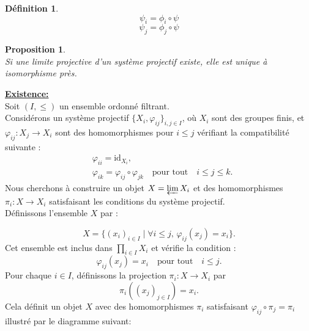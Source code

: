 \documentclass[a4paper, 14pt]{report}
\newtheorem{definition}{Définition}[section]
\newtheorem{proposition}{Proposition}[section]
\begin{document}
\begin{onehalfspace}
{\begin{definition}
				
				\[ \psi_{i} = \phi_{i} \circ \psi \]
				\[ \psi_{j} = \phi_{j} \circ \psi \]
				
			\end{definition}
			
			\begin{proposition}  \cite{maclane1971categories}\\
				Si une limite projective d'un système projectif existe, elle est unique à isomorphisme près.
			\end{proposition}
			
			\textbf{\underline{Existence:}}\\
			Soit \((I, \leq)\) un ensemble ordonné filtrant.\\
			Considérons un système projectif \(\{X_i, \varphi_{ij}\}_{i, j \in I}\), où \(X_i\) sont des groupes finis, et \(\varphi_{ij} : X_j \to X_i\) sont des homomorphismes pour \(i \leq j\) vérifiant la compatibilité suivante :
			\[
			\begin{aligned}
				&\varphi_{ii} = \text{id}_{X_i}, \\
				&\varphi_{ik} = \varphi_{ij} \circ \varphi_{jk} \quad \text{pour tout} \quad i \leq j \leq k.
			\end{aligned}
			\]
			Nous cherchons à construire un objet \(X = \varprojlim X_i\) et des homomorphismes \(\pi_i : X \to X_i\) satisfaisant les conditions du système projectif.\\
			Définissons l'ensemble \(X\) par :
			
			\[
			X = \{(x_i)_{i \in I} \mid \forall i \leq j, \, \varphi_{ij}(x_j) = x_i\}.
			\]
			Cet ensemble est inclus dans \(\prod_{i \in I} X_i\) et vérifie la condition :\\
			\[
			\varphi_{ij}(x_j) = x_i \quad \text{pour tout} \quad i \leq j.
			\]
			Pour chaque \(i \in I\), définissons la projection \(\pi_i : X \to X_i\) par 
			\[
			\pi_i((x_j)_{j \in I}) = x_i.
			\]
			Cela définit un objet \(X\) avec des homomorphismes \(\pi_i\) satisfaisant \(\varphi_{ij} \circ \pi_j = \pi_i\) illustré par le diagramme suivant:
			
}
\end{onehalfspace}
\end{document}
